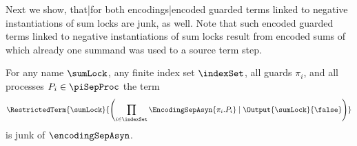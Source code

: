 \documentclass[]{llncs}
\begin{document}
Next we show, that|for both encodings|encoded guarded terms linked to negative instantiations of sum locks are junk, as well. Note that such encoded guarded terms linked to negative instantiations of sum locks result from encoded sums of which already one summand was used to \simulate a source term step.

\begin{lemma} \label{lem:junkRemainsOfSumsSepAsyn}
	For any name $ \sumLock $, any finite index set $ \indexSet $, all guards $ \pi_i $, and all processes $ P_i \in \piSepProc $ the term
	\begin{align*}
		\RestrictedTerm{\sumLock}{\left( \prod_{i \in \indexSet} \EncodingSepAsyn{\pi_i.P_i} \mid \Output{\sumLock}{\false} \right)}
	\end{align*}
	is junk of $ \encodingSepAsyn $.
\end{lemma}
\end{document}
